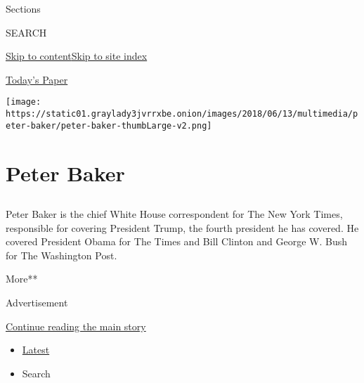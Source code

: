 Sections

SEARCH

\protect\hyperlink{site-content}{Skip to
content}\protect\hyperlink{site-index}{Skip to site index}

\href{https://myaccount.nytimes3xbfgragh.onion/auth/login?response_type=cookie\&client_id=vi}{}

\href{https://www.nytimes3xbfgragh.onion/section/todayspaper}{Today's
Paper}

\texttt{[image: https://static01.graylady3jvrrxbe.onion/images/2018/06/13/multimedia/peter-baker/peter-baker-thumbLarge-v2.png]}

\hypertarget{peter-baker}{%
\section{Peter Baker}\label{peter-baker}}

\subsection{}

Peter Baker is the chief White House correspondent for The New York
Times, responsible for covering President Trump, the fourth president he
has covered. He covered President Obama for The Times and Bill Clinton
and George W. Bush for The Washington Post.

More**

Advertisement

\protect\hyperlink{after-mid1}{Continue reading the main story}

\begin{itemize}
\tightlist
\item
  \protect\hyperlink{stream-panel}{Latest}
\item
  Search
\end{itemize}


